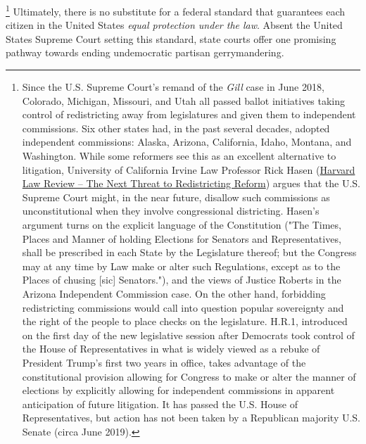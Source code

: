         \footnote{Since the U.S. Supreme Court's remand of the \textit{Gill} case in June 2018, Colorado, Michigan, Missouri, and Utah all passed ballot initiatives taking control of redistricting away from legislatures and given them to independent commissions. Six other states had, in the past several decades, adopted independent commissions: Alaska, Arizona, California, Idaho, Montana, and Washington. While some reformers see this as an excellent alternative to litigation, University of California Irvine Law Professor Rick Hasen (\href{https://blog.harvardlawreview.org/the-next-threat-to-redistricting-reform/}{Harvard Law Review -- The Next Threat to Redistricting Reform}) argues that the U.S. Supreme Court might, in the near future, disallow such commissions as unconstitutional when they involve congressional districting. Hasen's argument turns on the explicit language of the Constitution ("The Times, Places and Manner of holding Elections for Senators and Representatives, shall be prescribed in each State by the Legislature thereof; but the Congress may at any time by Law make or alter such Regulations, except as to the Places of chusing [sic] Senators."), and the views of Justice Roberts in the Arizona Independent Commission case. On the other hand, forbidding redistricting commissions would call into question popular sovereignty and the right of the people to place checks on the legislature. H.R.1, introduced on the first day of the new legislative session after Democrats took control of the House of Representatives in what is widely viewed as a rebuke of President Trump's first two years in office, takes advantage of the constitutional provision allowing for Congress to make or alter the manner of elections by explicitly allowing for independent commissions in apparent anticipation of future litigation. It has passed the U.S. House of Representatives, but action has not been taken by a Republican majority U.S. Senate (circa June 2019).}
	Ultimately, there is no substitute for a federal standard that guarantees each citizen in the United States \textit{equal protection under the law}. Absent the United States Supreme Court setting this standard, state courts offer one promising pathway towards ending undemocratic partisan gerrymandering.

